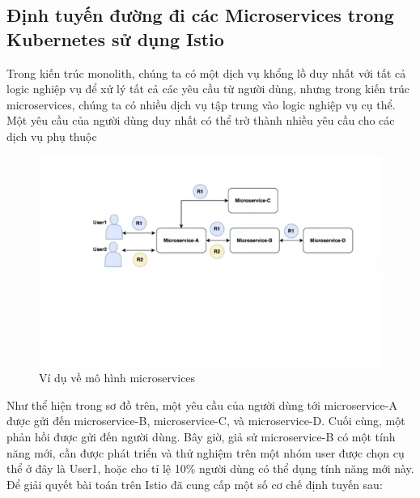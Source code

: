 \documentclass[12pt,a4paper]{report}
\begin{document}
		\subsection{Định tuyến đường đi các Microservices trong Kubernetes sử dụng Istio}
			\hspace{0.6cm} Trong kiến trúc monolith, chúng ta có một dịch vụ khổng lồ duy nhất với tất cả logic nghiệp vụ để xử lý tất cả các yêu cầu từ người dùng, nhưng trong kiến trúc microservices, chúng ta có nhiều dịch vụ tập trung vào logic nghiệp vụ cụ thể. Một yêu cầu của người dùng duy nhất có thể trờ thành nhiều yêu cầu cho các dịch vụ phụ thuộc
			\begin{figure}[h]
				\centering
				\includegraphics[width=0.7\linewidth]{Pics/2.2.2-p4}
				\caption{Ví dụ về mô hình microservices}
				\label{fig:2}
			\end{figure}
			Như thể hiện trong sơ đồ trên, một yêu cầu của người dùng tới microservice-A được gửi đến microservice-B, microservice-C, và microservice-D. Cuối cùng, một phản hồi được gửi đến người dùng. Bây giờ, giả sử microservice-B có một tính năng mới, cần được phát triển và thử nghiệm trên một nhóm user được chọn cụ thể ở đây là User1, hoặc cho tỉ lệ 10\% người dùng có thể dụng tính năng mới này. 
			Để giải quyết bài toán trên Istio đã cung cấp một số cơ chế định tuyến sau:
\end{document}

